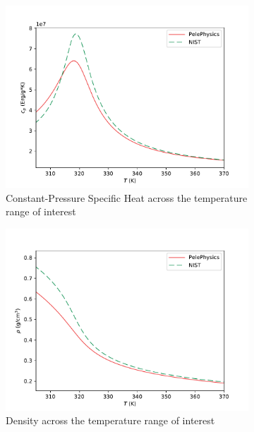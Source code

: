 \begin{figure}[H]
\begin{subfigure}{0.45\textwidth}
	\centering
	\includegraphics[scale=.45]{figures/Plots/NIST/cp_NIST_comp.pdf}
	\caption{Constant-Pressure Specific Heat across the temperature range of interest} \label{cp_NIST_comp}
\end{subfigure}
\hfill
\begin{subfigure}{0.45\textwidth}
	\centering
	\includegraphics[scale=.45]{figures/Plots/NIST/rho_NIST_comp.pdf}
	\caption{Density across the temperature range of interest} \label{rho_NIST_comp}
\end{subfigure}
\vfill
\begin{subfigure}{0.45\textwidth}

\end{subfigure}
\end{figure}
